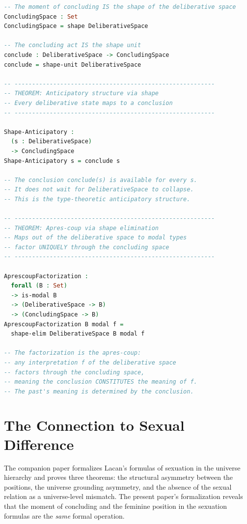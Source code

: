 \documentclass[12pt]{article}
\theoremstyle{definition}
\theoremstyle{remark}
\begin{document}
\begin{lstlisting}[language=Agda, caption={Shape modality formalization (conditional on postulates)}]
-- The moment of concluding IS the shape of the deliberative space
ConcludingSpace : Set
ConcludingSpace = shape DeliberativeSpace

-- The concluding act IS the shape unit
conclude : DeliberativeSpace -> ConcludingSpace
conclude = shape-unit DeliberativeSpace

-- ---------------------------------------------------------
-- THEOREM: Anticipatory structure via shape
-- Every deliberative state maps to a conclusion
-- ---------------------------------------------------------

Shape-Anticipatory :
  (s : DeliberativeSpace)
  -> ConcludingSpace
Shape-Anticipatory s = conclude s

-- The conclusion conclude(s) is available for every s.
-- It does not wait for DeliberativeSpace to collapse.
-- This is the type-theoretic anticipatory structure.

-- ---------------------------------------------------------
-- THEOREM: Apres-coup via shape elimination
-- Maps out of the deliberative space to modal types
-- factor UNIQUELY through the concluding space
-- ---------------------------------------------------------

AprescoupFactorization :
  forall (B : Set)
  -> is-modal B
  -> (DeliberativeSpace -> B)
  -> (ConcludingSpace -> B)
AprescoupFactorization B modal f =
  shape-elim DeliberativeSpace B modal f

-- The factorization is the apres-coup:
-- any interpretation f of the deliberative space
-- factors through the concluding space,
-- meaning the conclusion CONSTITUTES the meaning of f.
-- The past's meaning is determined by the conclusion.
\end{lstlisting}

\section{The Connection to Sexual Difference}

The companion paper \cite{papathanasiou2026c} formalizes Lacan's formulas of sexuation in the universe hierarchy and proves three theorems: the structural asymmetry between the positions, the universe grounding asymmetry, and the absence of the sexual relation as a universe-level mismatch. The present paper's formalization reveals that the moment of concluding and the feminine position in the sexuation formulas are the \emph{same} formal operation.
\end{document}
